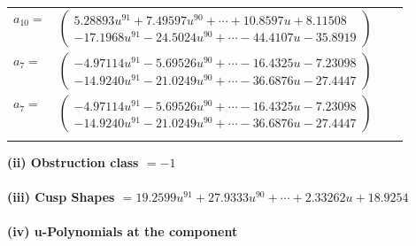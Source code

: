 \documentclass[1p]{elsarticle_modified}
\theoremstyle{definition}
\begin{document}
\begin{tabular}{m{7pt} m{180pt} m{7pt} m{180pt} }
\flushright $a_{10}=$&$\begin{pmatrix}5.28893 u^{91}+7.49597 u^{90}+\cdots+10.8597 u+8.11508\\-17.1968 u^{91}-24.5024 u^{90}+\cdots-44.4107 u-35.8919\end{pmatrix}$ \\
\flushright $a_{7}=$&$\begin{pmatrix}-4.97114 u^{91}-5.69526 u^{90}+\cdots-16.4325 u-7.23098\\-14.9240 u^{91}-21.0249 u^{90}+\cdots-36.6876 u-27.4447\end{pmatrix}$\\ \flushright $a_{7}=$&$\begin{pmatrix}-4.97114 u^{91}-5.69526 u^{90}+\cdots-16.4325 u-7.23098\\-14.9240 u^{91}-21.0249 u^{90}+\cdots-36.6876 u-27.4447\end{pmatrix}$\\&\end{tabular}
\flushleft \textbf{(ii) Obstruction class $= -1$}\\~\\
\flushleft \textbf{(iii) Cusp Shapes $= 19.2599 u^{91}+27.9333 u^{90}+\cdots+2.33262 u+18.9254$}\\~\\
\newpage\renewcommand{\arraystretch}{1}
\flushleft \textbf{(iv) u-Polynomials at the component}\newline \\
\end{document}
